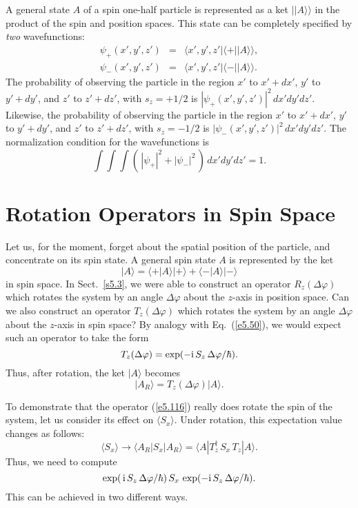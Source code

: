 A general state $A$ of a spin one-half particle is represented as a ket
$||A\rangle\rangle$ in the product  of the spin and position spaces. 
This state can be completely specified by {\em two} wavefunctions:
\begin{eqnarray}
\psi_+(x', y', z') &=& \langle x', y', z' |\langle +||A\rangle\rangle,\\[0.5ex]
\psi_-(x', y', z') &=& \langle x', y', z' |\langle -||A\rangle\rangle.
\end{eqnarray}
The probability of observing the particle in the region $x'$ to $x'+dx'$,
$y'$ to $y'+dy'$, and $z'$ to $z'+dz'$, with $s_z = +1/2$ is
$|\psi_+ (x', y', z')|^2\,dx' dy' dz'$. Likewise, 
the probability of observing the particle in the region $x'$ to $x'+dx'$,
$y'$ to $y'+dy'$, and $z'$ to $z'+dz'$, with $s_z = -1/2$ is
$|\psi_- (x', y', z')|^2\,dx' dy' dz'$.
The normalization condition for the wavefunctions is
\begin{equation}
\int\!\int\!\int \left(\, |\psi_+|^2 + |\psi_-|^2\,\right)\, dx'dy'dz' = 1.
\end{equation}

\section{Rotation Operators in Spin Space}\label{s5.9}
Let us, for the moment, forget about the spatial position of the particle,
and concentrate on its spin state. A general
spin state $A$ is represented by the ket
\begin{equation}\label{e5.115}
|A\rangle = \langle +|A\rangle |+\rangle + \langle -|A\rangle |-\rangle
\end{equation}
in spin space.
In Sect.~\ref{s5.3}, we were able  to construct an operator $R_z(\Delta\varphi)$ which
rotates the system by an angle $\Delta\varphi$ about the $z$-axis in position
space. Can we also construct an operator $T_z(\Delta\varphi)$ which rotates the
system by an angle $\Delta\varphi$ about the $z$-axis in spin space? By analogy
with Eq.~(\ref{e5.50}), we would expect such an operator to take the form
\begin{equation}\label{e5.116}
T_z(\Delta\varphi) = \exp(-{\rm i} \,S_z\, \Delta\varphi/\hbar).
\end{equation}
Thus, after rotation, the ket $|A\rangle$ becomes
\begin{equation}
|A_R\rangle = T_z(\Delta\varphi) |A\rangle.
\end{equation}

To demonstrate that the operator (\ref{e5.116})  really does rotate the spin of the system,
let us consider its effect on $\langle S_x\rangle$. Under rotation, this
expectation value changes as follows:
\begin{equation}
\langle S_x\rangle \rightarrow \langle A_R| S_x |A_R \rangle
= \langle A| T_z^{\dag}\, S_x \,T_z |A\rangle.
\end{equation}
Thus, we need to compute
\begin{equation}\label{e5.119}
\exp(\,{\rm i}\,S_z\, \Delta\varphi/\hbar)\, S_x \,
\exp(-{\rm i}\,S_z \,\Delta\varphi/\hbar).
\end{equation}
This can be achieved in two different ways. 


